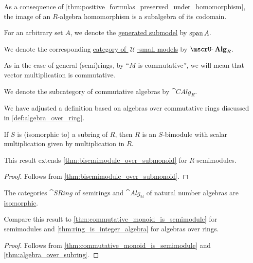 \begin{definition}
\begin{thmenum}
    As a consequence of \cref{thm:positive_formulas_preserved_under_homomorphism}, the image of an \( R \)-algebra homomorphism is a subalgebra of its codomain.

     For an arbitrary set \( A \), we denote the \hyperref[def:first_order_generated_substructure]{generated submodel} by \( \operatorname{span}{ A } \).

     We denote the corresponding \hyperref[def:category_of_small_first_order_models]{category of \( \mscrU \)-small models} by \( \ucat{Alg}_R \).

     As in the case of general (semi)rings, by \enquote{\( M \) is commutative}, we will mean that vector multiplication is commutative.

    We denote the subcategory of commutative algebras by \( \cat{CAlg}_R \).
  \end{thmenum}
\end{definition}
\begin{comments}
  \item We have adjusted a definition based on algebras over commutative rings discussed in \cref{def:algebra_over_ring}.
\end{comments}

\begin{proposition}\label{thm:algebra_over_subring}
  If \( S \) is (isomorphic to) a subring of \( R \), then \( R \) is an \( S \)-bimodule with scalar multiplication given by multiplication in \( R \).
\end{proposition}
\begin{comments}
  \item This result extends \cref{thm:bisemimodule_over_submonoid} for \( R \)-semimodules.
\end{comments}
\begin{proof}
  Follows from \cref{thm:bisemimodule_over_submonoid}.
\end{proof}

\begin{corollary}\label{thm:semiring_is_natural_number_algebra}
  The categories \( \hyperref[def:semiring/category]{\cat{SRing}} \) of semirings and \( \hyperref[def:algebra_over_semiring/category]{\cat{Alg}_\BbbN} \) of natural number algebras are \hyperref[rem:category_similarity/isomorphism]{isomorphic}.
\end{corollary}
\begin{comments}
  \item Compare this result to \cref{thm:commutative_monoid_is_semimodule} for semimodules and \cref{thm:ring_is_integer_algebra} for algebras over rings.
\end{comments}
\begin{proof}
  Follows from \cref{thm:commutative_monoid_is_semimodule} and \cref{thm:algebra_over_subring}.
\end{proof}

